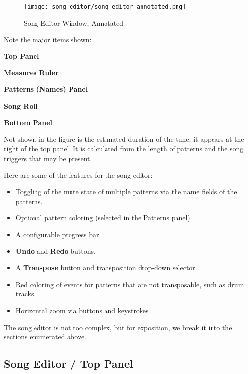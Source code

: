 \begin{figure}[H]
   \centering 
   \texttt{[image: song-editor/song-editor-annotated.png]}
   \caption{Song Editor Window, Annotated}
   \label{fig:song_editor_window_annotated}
\end{figure}

   Note the major items shown:

   \begin{enumber}
      \item \textbf{Top Panel}
      \item \textbf{Measures Ruler}
      \item \textbf{Patterns (Names) Panel}
      \item \textbf{Song Roll}
      \item \textbf{Bottom Panel}
   \end{enumber}

   Not shown in the figure is the estimated duration of the tune; it appears
   at the right of the top panel.  It is calculated from the length of patterns
   and the song triggers that may be present.

   Here are some of the features for the song editor:

   \begin{itemize}
      \item Toggling of the mute state of multiple patterns
         via the name fields of the patterns.
      \item Optional pattern coloring (selected in the Patterns panel)
      \item A configurable progress bar.
      \item \textbf{Undo} and \textbf{Redo} buttons.
      \item A \textbf{Transpose} button and transposition drop-down selector.
      \item Red coloring of events for patterns that are not transposable, such
         as drum tracks.
      \item Horizontal zoom via buttons and keystrokes
   \end{itemize}

   The song editor is not too complex, but for exposition, we break it into
   the sections enumerated above.

\subsection{Song Editor / Top Panel}
\label{subsec:song_editor_top}

